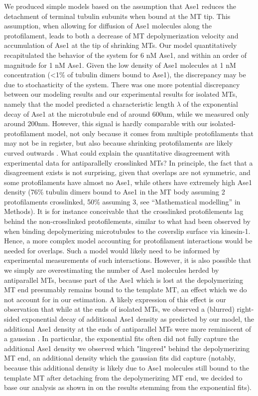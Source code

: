 We produced simple models based on the assumption that Ase1 reduces the detachment of terminal tubulin subunits when bound at the MT tip. This assumption, when allowing for diffusion of Ase1 molecules along the protofilament, leads to both a decrease of MT depolymerization velocity and accumulation of Ase1 at the tip of shrinking MTs. Our model quantitatively recapitulated the behavior of the system for 6 nM Ase1, and within an order of magnitude for 1 nM Ase1. Given the low density of Ase1 molecules at 1 nM concentration (<1\% of tubulin dimers bound to Ase1), the discrepancy may be due to stochasticity of the system. There was one more potential discrepancy between our modeling results and our experimental results for isolated MTs, namely that the model predicted a characteristic length $\lambda$ of the exponential decay of Ase1 at the microtubule end of around 600nm, while we measured only around 200nm. However, this signal is hardly comparable with our isolated-protofilament model, not only because it comes from multiple protofilaments that may not be in register, but also because shrinking protofilaments are likely curved outwards \parencite{McIntosh2008}. What could explain the quantitative disagreement with experimental data for antiparallelly crosslinked MTs? In principle, the fact that a disagreement exists is not surprising, given that overlaps are not symmetric, and some protofilaments have almost no Ase1, while others have extremely high Ase1 density (76\% tubulin dimers bound to Ase1 in the MT body assuming 2 protofilaments crosslinked, 50\% assuming 3, see “Mathematical modelling” in Methods). It is for instance conceivable that the crosslinked protofilements lag behind the non-crosslinked protofilements, similar to what had been observed by \cite{Peet2018} when binding depolymerizing microtubules to the coverslip surface via kinesin-1. Hence, a more complex model accounting for protofilament interactions would be needed for overlaps. Such a model would likely need to be informed by experimental measurements of such interactions. However, it is also possible that we simply are overestimating the number of Ase1 molecules herded by antiparallel MTs, because part of the Ase1 which is lost at the depolymerizing MT end presumably remains bound to the template MT, an effect which we do not account for in our estimation. A likely expression of this effect is our observation that while at the ends of isolated MTs, we observed a (blurred) right-sided exponential decay of additional Ase1 density as predicted by our model, the additional Ase1 density at the ends of antiparallel MTs were more reminiscent of a gaussian . In particular, the exponential fits often did not fully capture the additional Ase1 density we observed which "lingered" behind the depolymerizing MT end, an additional density which the gaussian fits did capture (notably, because this additional density is likely due to Ase1 molecules still bound to the template MT after detaching from the depolymerizing MT end, we decided to base our analysis as shown in  on the results stemming from the exponential fits).

